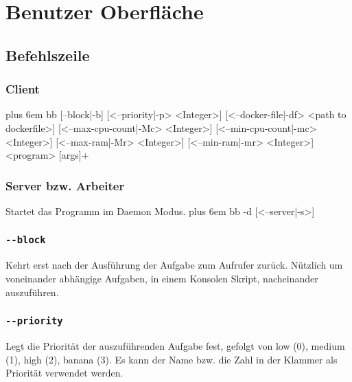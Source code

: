 \documentclass[a4paper,12pt]{article}
\makeatletter
\newenvironment{mycode}
 {\def\@xobeysp{\ }\verbatim\rightskip=0pt plus 6em\relax}
 {\endverbatim}
\makeatother
\begin{document}







\section{Benutzer Oberfläche}
\subsection{Befehlszeile}
\subsubsection{Client}
\begin{mycode}
bb [--block|-b] [<--priority|-p> <Integer>] [<--docker-file|-df> <path to dockerfile>] [<--max-cpu-count|-Mc> <Integer>] [<--min-cpu-count|-mc> <Integer>] [<--max-ram|-Mr> <Integer>] [<--min-ram|-mr> <Integer>] <program> [args]+
\end{mycode}

\subsubsection{Server bzw. Arbeiter}
Startet das Programm im \gls{Daemon} Modus.
\begin{mycode}
bb -d [<--server|-s>]
\end{mycode}

\subsubsection{\texttt{-{}-block}}
Kehrt erst nach der Ausführung der Aufgabe zum Aufrufer zurück. Nützlich um voneinander abhängige Aufgaben, in einem Konsolen Skript, nacheinander auszuführen.

\subsubsection{\texttt{-{}-priority}}
Legt die Priorität der auszuführenden Aufgabe fest, gefolgt von low (0), medium (1), high (2), banana (3).
Es kann der Name bzw. die Zahl in der Klammer als Priorität verwendet werden.
\end{document}
